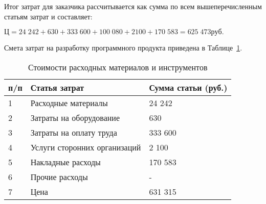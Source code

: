 Итог затрат для заказчика рассчитывается как сумма по всем вышеперечисленным статьям затрат и составляет:

$Ц = 24 \; 242+ 630 + 333 \; 600  + 100 \; 080  + 2100 + 170 \; 583   =  625 \; 473  руб.$

Смета затрат на разработку программного продукта приведена в Таблице~\ref{tab:c}.

\begin{table}[htb]
	\caption{Стоимости расходных материалов и инструментов}\label{tab:c}
    \centering
        \begin{tabular}{|l|l|l|}
        		\hline
        		\textnumero п/п & Статья затрат & Сумма статьи (руб.) \\
        		\hline
        		1 & Расходные материалы & 24 242 \\
        		\hline
        		2  & Затраты на оборудование & 630 \\
        		\hline
        		3  & Затраты на оплату труда & 333 600 \\
        		\hline
        		4  & Услуги сторонних организаций & 2 100 \\
        		\hline
        		5  &  Накладные расходы & 170 583 \\
        		\hline
        		6 & Прочие расходы & - \\
        		\hline
        		7 & Цена & 631 315 \\
        		\hline
        \end{tabular}   		
\end{table}


